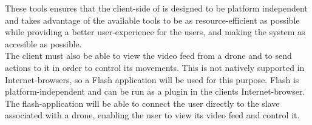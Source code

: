 These tools ensures that the client-side of \projectname{} is designed to be platform independent and takes advantage of the available tools to be as resource-efficient as possible while providing a better user-experience for the users, and making the system as accesible as possible. \\

The client must also be able to view the video feed from a drone and to send actions to it in order to control its movements.
This is not natively supported in Internet-browsers, so a Flash application will be used for this purpose.
Flash is platform-independent and can be run as a plugin in the clients Internet-browser.
The flash-application will be able to connect the user directly to the slave associated with a drone, enabling the user to view its video feed and control it.

